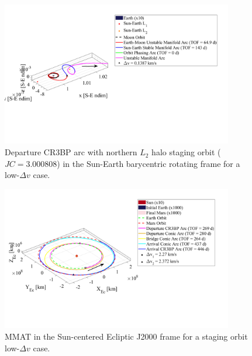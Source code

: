 \begin{figure}[!htb]
    \centering
    \includegraphics[width=0.9\textwidth]{figures/StagedMinDvSE.pdf}
    \caption{Departure CR3BP arc with northern $L_{2}$ halo staging orbit ($JC=3.000808$) in the Sun-Earth barycentric rotating frame for a low-$\Delta v$ case.}
    \label{fig:stagedMinDvSE}
\end{figure}

\begin{figure}[!htb]
    \centering
    \includegraphics[width=0.9\textwidth]{figures/StagedMinDvMMAT.pdf}
    \caption{MMAT in the Sun-centered Ecliptic J2000 frame for a staging orbit low-$\Delta v$ case.}
    \label{fig:stagedMinDvMMAT}
\end{figure}

